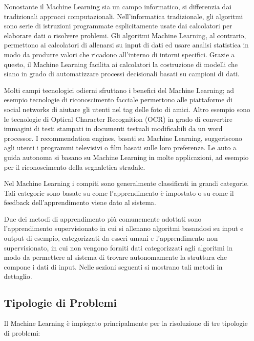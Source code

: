 Nonostante il Machine Learning sia un campo informatico, si differenzia dai tradizionali approcci computazionali. Nell'informatica tradizionale, gli algoritmi sono serie di istruzioni programmate esplicitamente usate dai calcolatori per elaborare dati o risolvere problemi. Gli algoritmi Machine Learning, al contrario, permettono ai calcolatori di allenarsi su input di dati ed usare analisi statistica in modo da produrre valori che ricadono all'interno di intorni specifici. Grazie a questo, il Machine Learning facilita ai calcolatori la costruzione di modelli che siano in grado di automatizzare processi decisionali basati su campioni di dati.

Molti campi tecnologici odierni sfruttano i benefici del Machine Learning; ad esempio tecnologie di riconoscimento facciale permettono alle piattaforme di social networks di aiutare gli utenti nel tag delle foto di amici. Altro esempio sono le tecnologie di Optical Character Recognition (OCR) in grado di convertire immagini di testi stampati in documenti testuali modificabili da un word processor. I recommendation engines, basati su Machine Learning, suggeriscono agli utenti i programmi televisivi o film basati sulle loro preferenze. Le auto a guida autonoma si basano su Machine Learning in molte applicazioni, ad esempio per il riconoscimento della segnaletica stradale.

Nel Machine Learning i compiti sono generalmente classificati in grandi categorie. Tali categorie sono basate su come l'apprendimento è impostato o su come il feedback dell'apprendimento viene dato al sistema.

Due dei metodi di apprendimento più comunemente adottati sono l'apprendimento supervisionato in cui si allenano algoritmi basandosi su input e output di esempio, categorizzati da esseri umani e l'apprendimento non supervisionato, in cui non vengono forniti dati categorizzati agli algoritmi in modo da permettere al sistema di trovare autonomamente la struttura che compone i dati di input. Nelle sezioni seguenti si mostrano tali metodi in dettaglio.

\subsection{Tipologie di Problemi}
Il Machine Learning è impiegato principalmente per la risoluzione di tre tipologie di problemi:

